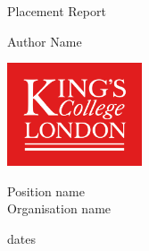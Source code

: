 \begin{titlepage}
    \vspace*{1mm}
    \begin{center}
        \Huge Placement Report
    \end{center}
    \addvspace{25mm}
    \begin{center}
        \LARGE Author Name
    \end{center}
    \addvspace{35mm}
    \begin{center}
        \includegraphics[width=40mm]{KCL-Logo.png}
    \end{center}
    \addvspace{28mm}
    \begin{center}
        \Large Position name\\
        Organisation  name
    \end{center}
    \addvspace{15mm}
    \begin{center}\Large dates\end{center}
\end{titlepage}

